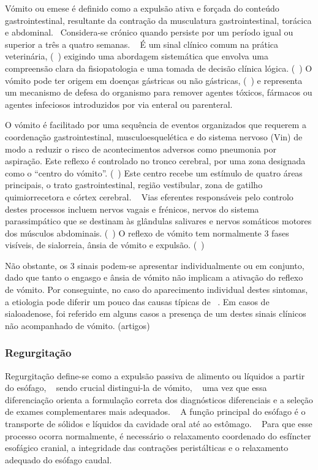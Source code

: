 Vómito ou emese é definido como a expulsão ativa e forçada do conteúdo gastrointestinal, resultante da contração da musculatura gastrointestinal, torácica e abdominal. ~\cite{Das_Textbook}Considera-se crónico quando persiste por um período igual ou superior a três a quatro semanas. ~\cite{bsava_2020_gastro} É um sinal clínico comum na prática veterinária, (~\cite{Dixit2022}) exigindo uma abordagem sistemática que envolva uma compreensão clara da fisiopatologia e uma tomada de decisão clínica lógica. (~\cite{Elwood2010}) O vómito pode ter origem em doenças gástricas ou não gástricas, (~\cite{McGrotty2010}) e representa um mecanismo de defesa do organismo para remover agentes tóxicos, fármacos ou agentes infeciosos introduzidos por via enteral ou parenteral. ~\cite{Das_Textbook}


O vómito é facilitado por uma sequência de eventos organizados que requerem a coordenação gastrointestinal, musculoesquelética e do sistema nervoso (Vin) de modo a reduzir o risco de acontecimentos adversos como pneumonia por aspiração. Este reflexo é controlado no tronco cerebral, por uma zona designada como o “centro do vómito”. (~\cite{Elwood2010}) Este centro recebe um estímulo de quatro áreas principais, o trato gastrointestinal, região vestibular, zona de gatilho quimiorrecetora  e córtex cerebral. ~\cite{Das_Textbook} Vias eferentes responsáveis pelo controlo destes processos incluem nervos vagais e frénicos, nervos do sistema parassimpático que se destinam às glândulas salivares e nervos somáticos motores dos músculos abdominais. (~\cite{Elwood2010}) O reflexo de vómito tem normalmente 3 fases visíveis, de sialorreia, ânsia de vómito e expulsão. (~\cite{Elwood2010}) 


Não obstante, os 3 sinais podem-se apresentar individualmente ou em conjunto, dado que tanto o engasgo e ânsia de vómito não implicam a ativação do reflexo de vómito. Por conseguinte, no caso do aparecimento individual destes sintomas, a etiologia pode diferir um pouco das causas típicas de ~\cite{Elwood2010,Das_Textbook}.  Em casos de sialoadenose, foi referido em alguns casos a presença de um destes sinais clínicos não acompanhado de vómito. (artigos)


\subsubsection{Regurgitação}

Regurgitação define-se como a expulsão passiva de alimento ou líquidos a partir do esófago, ~\cite{bsava_2020_gastro,canine_gastro_2013} sendo crucial distingui-la de vómito, ~\cite{canine_gastro_2013} uma vez que essa diferenciação orienta a formulação correta dos diagnósticos diferenciais e a seleção de exames complementares mais adequados. ~\cite{bsava_2020_gastro}
A função principal do esófago é o transporte de sólidos e líquidos da cavidade oral até ao estômago. ~\cite{canine_gastro_2013} Para que esse processo ocorra normalmente, é necessário o relaxamento coordenado do esfíncter esofágico cranial, a integridade das contrações peristálticas e o relaxamento adequado do esófago caudal. ~\cite{canine_gastro_2013}


